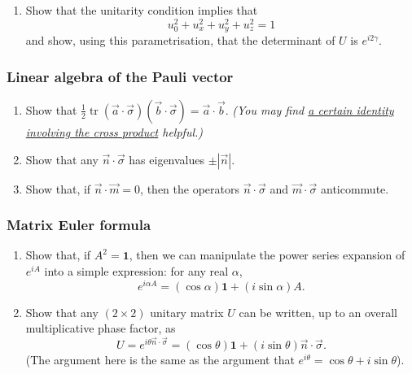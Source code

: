 \documentclass[fleqn]{article}
\providecommand{\tightlist}{%
  \setlength{\itemsep}{0pt}\setlength{\parskip}{0pt}}
\begin{document}
\begin{enumerate}
\def\labelenumi{\arabic{enumi}.}
\setcounter{enumi}{1}
\tightlist
\item
  Show that the unitarity condition implies that
  \[
     u_0^2 + u_x^2 + u_y^2 + u_z^2 = 1
   \]
  and show, using this parametrisation, that the determinant of \(U\) is \(e^{i2\gamma}\).
\end{enumerate}

\hypertarget{linear-algebra-of-the-pauli-vector}{%
\subsubsection{Linear algebra of the Pauli vector}\label{linear-algebra-of-the-pauli-vector}}

\begin{enumerate}
\def\labelenumi{\arabic{enumi}.}
\item
  Show that \(\frac12\operatorname{tr}(\vec{a}\cdot\vec{\sigma})(\vec{b}\cdot\vec{\sigma}) = \vec{a}\cdot\vec{b}\). \emph{(You may find \protect\hyperlink{cross-product-identity}{a certain identity involving the cross product} helpful.)}
\item
  Show that any \(\vec{n}\cdot\vec{\sigma}\) has eigenvalues \(\pm|\vec{n}|\).
\item
  Show that, if \(\vec{n}\cdot\vec{m}=0\), then the operators \(\vec{n}\cdot\vec{\sigma}\) and \(\vec{m}\cdot\vec{\sigma}\) anticommute.
\end{enumerate}

\hypertarget{matrix-euler-formula}{%
\subsubsection{Matrix Euler formula}\label{matrix-euler-formula}}

\begin{enumerate}
\def\labelenumi{\arabic{enumi}.}
\item
  Show that, if \(A^2=\mathbf{1}\), then we can manipulate the power series expansion of \(e^{iA}\) into a simple expression: for any real \(\alpha\),
  \[
     e^{i\alpha A}
     = (\cos\alpha)\mathbf{1}+ (i\sin\alpha)A.
   \]
\item
  Show that any \((2\times 2)\) unitary matrix \(U\) can be written, up to an overall multiplicative phase factor, as
  \[
     U
     = e^{i \theta \vec{n}\cdot\vec{\sigma}}
     = (\cos\theta)\mathbf{1}+ (i\sin\theta)\vec{n}\cdot\vec{\sigma}.
   \]
  (The argument here is the same as the argument that \(e^{i\theta}=\cos\theta +i\sin\theta\)).
\end{enumerate}
\end{document}
